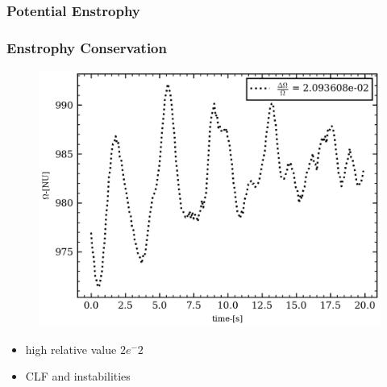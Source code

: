 \documentclass[numbering=fraction]{beamer}
\begin{document}
\subsubsection{Potential Enstrophy}
\begin{frame}
    \frametitle{Enstrophy Conservation}
    \begin{minipage}{.6\linewidth}

        \begin{figure}[H]
            \centering
            \includegraphics[width=1\linewidth]{./figure/potential_enstrophy_common_wave.png}
        \end{figure}
    \end{minipage}
    \begin{minipage}{.38\linewidth}

        \begin{itemize}
            \item high relative value $2e^-2$
            \item CLF and instabilities

        \end{itemize}
    \end{minipage}
\end{frame}
\end{document}
